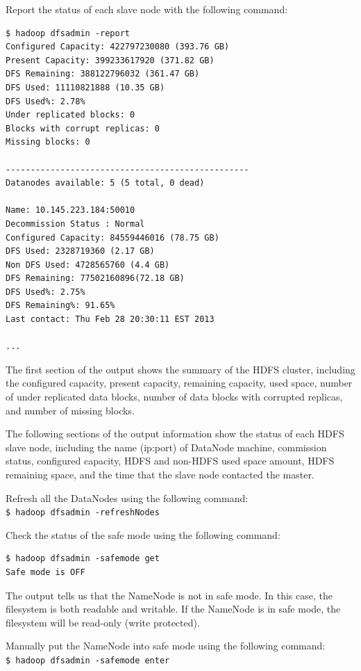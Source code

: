 Report the status of each slave node with the following command: 
\lstset{style=bashstyle}
\begin{lstlisting}
$ hadoop dfsadmin -report
Configured Capacity: 422797230080 (393.76 GB)
Present Capacity: 399233617920 (371.82 GB)
DFS Remaining: 388122796032 (361.47 GB)
DFS Used: 11110821888 (10.35 GB)
DFS Used%: 2.78%
Under replicated blocks: 0
Blocks with corrupt replicas: 0
Missing blocks: 0

-------------------------------------------------
Datanodes available: 5 (5 total, 0 dead)

Name: 10.145.223.184:50010
Decommission Status : Normal
Configured Capacity: 84559446016 (78.75 GB)
DFS Used: 2328719360 (2.17 GB)
Non DFS Used: 4728565760 (4.4 GB)
DFS Remaining: 77502160896(72.18 GB)
DFS Used%: 2.75%
DFS Remaining%: 91.65%
Last contact: Thu Feb 28 20:30:11 EST 2013

...

\end{lstlisting}

The first section of the output shows the summary of the HDFS cluster, including the configured capacity, present capacity, remaining capacity, used space, number of under replicated data blocks, number of data blocks with corrupted replicas, and number of missing blocks.

The following sections of the output information show the status of each HDFS slave node, including the name (ip:port) of DataNode machine, commission status, configured capacity, HDFS and non-HDFS used space amount, HDFS remaining space, and the time that the slave node contacted the master.

Refresh all the DataNodes using the following command: \\
\verb|$ hadoop dfsadmin -refreshNodes|

Check the status of the safe mode using the following command:
\lstset{style=bashstyle}
\begin{lstlisting}
$ hadoop dfsadmin -safemode get
Safe mode is OFF
\end{lstlisting}

The output tells us that the NameNode is not in safe mode. In this case, the filesystem is both readable and writable. If the NameNode is in safe mode, the filesystem will be read-only (write protected).

Manually put the NameNode into safe mode using the following command: \\
\verb|$ hadoop dfsadmin -safemode enter|

